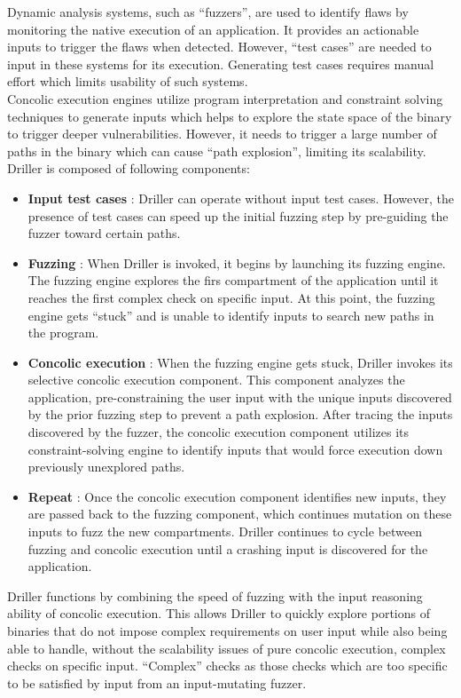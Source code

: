 \documentclass[a4paper, 11pt]{article}
\begin{document}
Dynamic analysis systems, such as ``fuzzers'', are used to identify flaws by monitoring the native execution of an application. It provides an actionable inputs to trigger the flaws when detected. However, ``test cases'' are needed to input in these systems for its execution. Generating test cases requires manual effort which limits usability of such systems.\\

Concolic execution engines utilize program interpretation and constraint solving techniques to generate inputs which helps to explore the state space of the binary to trigger deeper vulnerabilities. However, it needs to trigger a large number of paths in the binary which can cause ``path explosion'', limiting its scalability.\\

Driller is composed of following components:
\begin{itemize}
	\item \textbf{Input test cases} : Driller can operate without input test cases. However, the presence of test cases can speed up the initial fuzzing step by pre-guiding the fuzzer toward certain paths.
	\item \textbf{Fuzzing} : When Driller is invoked, it begins by launching its fuzzing engine. The fuzzing engine explores the firs compartment of the application until it reaches the first complex check on specific input. At this point, the fuzzing engine gets ``stuck'' and is unable to identify inputs to search new paths in the program.
	\item \textbf{Concolic execution} : When the fuzzing engine gets stuck, Driller invokes its selective concolic execution component. This component analyzes the application, pre-constraining the user input with the unique inputs discovered by the prior fuzzing step to prevent a path explosion. After tracing the inputs discovered by the fuzzer, the concolic execution component utilizes its constraint-solving engine to identify inputs that would force execution down previously unexplored paths.
	\item \textbf{Repeat} : Once the concolic execution component identifies new inputs, they are passed back to the fuzzing component, which continues mutation on these inputs to fuzz the new compartments. Driller continues to cycle between fuzzing and concolic execution until a crashing input is discovered for the application.
\end{itemize}

Driller functions by combining the speed of fuzzing with the input reasoning ability of concolic execution. This allows Driller to quickly explore portions of binaries that do not impose complex requirements on user input while also being able to handle, without the scalability issues of pure concolic execution, complex checks on specific input. ``Complex'' checks as those checks which are too specific to be satisfied by input from an input-mutating fuzzer.\\
\end{document}
